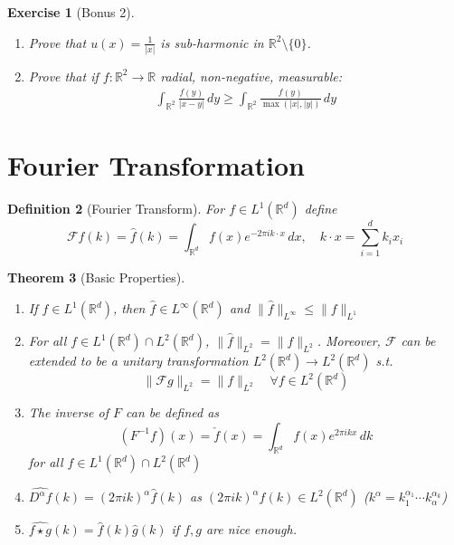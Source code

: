 \documentclass{report}
\theoremstyle{tommy}
\newtheorem{defn}{Definition}
\newtheorem{thm}[defn]{Theorem}
\newtheorem{ex}[defn]{Exercise}
\newcommand{\four}{\mathcal{F}}
\begin{document}
  \begin{ex}[Bonus 2]
    \begin{enumerate}[label=\alph*)]
      \item Prove that \(u(x) = \frac{1}{|x|}\) is sub-harmonic in \(\mathbb{R}^2 \setminus \{0\}\). 
      \item Prove that if \(f: \mathbb{R}^2 \to \mathbb{R}\) radial, non-negative, measurable:
      \begin{align*}
        \int_{\mathbb{R}^2} \frac{f(y)}{|x-y|} \, dy \ge \int_{\mathbb{R}^2} \frac{f(y)}{\max(|x|, |y|)} \, dy
      \end{align*}
    \end{enumerate}
  \end{ex}


  \section{Fourier Transformation}
  \begin{defn}[Fourier Transform]
    For \(f \in L^1(\mathbb{R}^d)\) define
    \[\four f(k) = \hat f(k) = \int_{\mathbb{R}^d} f(x) e^{- 2 \pi i k \cdot x} \, dx, \quad k\cdot x = \sum_{i=1}^d k_i x_i\]
  \end{defn}
  
  \begin{thm}[Basic Properties]
    \begin{enumerate}
      \item If \(f \in L^1(\mathbb{R}^d)\), then \(\hat f \in L^\infty(\mathbb{R}^d)\) and \(\| \hat f \|_{L^\infty} \le \|f\|_{L^1}\)
      \item For all \(f \in L^1(\mathbb{R}^d) \cap L^2(\mathbb{R}^d)\), \(\|\hat f\|_{L^2} = \|f\|_{L^2}\). Moreover, \(\four\) can be extended to be a unitary transformation \(L^2(\mathbb{R}^d) \to L^2(\mathbb{R}^d)\) s.t.
      \[\|\four g\|_{L^2} = \|f\|_{L^2} \quad \forall f \in L^2(\mathbb{R}^d)\]
      \item The inverse of \(F\) can be defined as
      \[(F^{-1}f)(x) = \check f (x) = \int_{\mathbb{R}^d} f(x) e^{2 \pi ik x} \, dk\] for all \(f \in L^1(\mathbb{R}^d) \cap L^2(\mathbb{R}^d)\)
      \item \(\widehat{D^\alpha f}(k) = (2 \pi i k)^\alpha \hat f(k)\) as \((2 \pi ik)^\alpha f(k) \in L^2(\mathbb{R}^d)\) (\(k^\alpha = k_1^{\alpha_1} \cdots k_\alpha^{\alpha_k}\))
      \item \(\widehat{f \star g}(k) = \hat f(k) \hat g (k)\) if \(f,g\) are nice enough.
    \end{enumerate}
  \end{thm}
\end{document}
